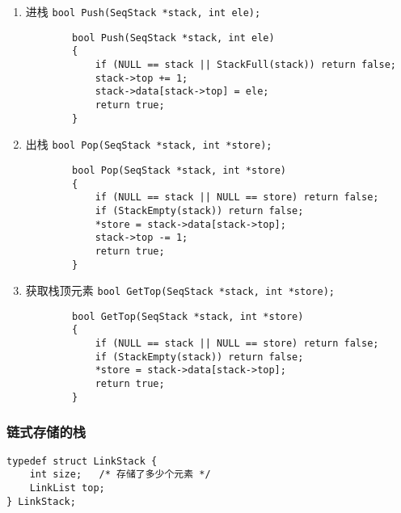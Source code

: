 \documentclass{ctexart}
\begin{document}
\begin{enumerate}
    \item 进栈 \texttt{bool Push(SeqStack *stack, int ele);}
        \begin{verbatim}
        bool Push(SeqStack *stack, int ele)
        {
            if (NULL == stack || StackFull(stack)) return false;
            stack->top += 1;
            stack->data[stack->top] = ele;
            return true;
        }
        \end{verbatim}

    \item 出栈 \texttt{bool Pop(SeqStack *stack, int *store);}
        \begin{verbatim}
        bool Pop(SeqStack *stack, int *store)
        {
            if (NULL == stack || NULL == store) return false;
            if (StackEmpty(stack)) return false;
            *store = stack->data[stack->top];
            stack->top -= 1;
            return true;
        }
        \end{verbatim}

    \item 获取栈顶元素 \texttt{bool GetTop(SeqStack *stack, int *store);}
        \begin{verbatim}
        bool GetTop(SeqStack *stack, int *store)
        {
            if (NULL == stack || NULL == store) return false;
            if (StackEmpty(stack)) return false;
            *store = stack->data[stack->top];
            return true;
        }
        \end{verbatim}

\end{enumerate}

\subsubsection{链式存储的栈}
\begin{verbatim}
typedef struct LinkStack {
    int size;   /* 存储了多少个元素 */
    LinkList top;
} LinkStack;
\end{verbatim}
\end{document}
